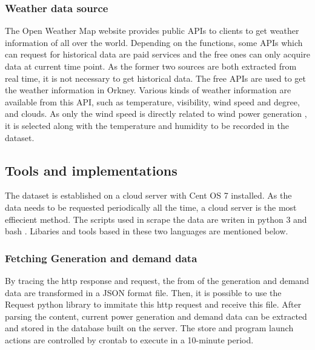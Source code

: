 \documentclass[12pt,a4paper]{report}
\begin{document}
            \subsubsection{Weather data source}
            \label{text_weather_data_source}
                The Open Weather Map website \cite{website:OpenWeatherMap} provides public APIs to clients to get weather information of all over the world.
                Depending on the functions, some APIs which can request for historical data are paid services and the free ones can only acquire data at current time point.
                As the former two sources are both extracted from real time, it is not necessary to get historical data. The free APIs are used to get the weather
                information in Orkney. Various kinds of weather information are available from this API, such as temperature, visibility, wind speed and degree, and clouds.
                As only the wind speed is directly related to wind power generation \cite{paper:Shao2010}, it is selected along with the temperature and humidity to be recorded in the dataset.
            
        \subsection{Tools and implementations}
        The dataset is established on a cloud server with Cent OS 7 installed. As the data needs to be requested periodically all the time, a cloud server is the most
        effiecient method. The scripts used in scrape the data are writen in python 3 \cite{website:python3} and bash \cite{website:bash}. Libaries and tools based in these two languages are mentioned below.

                \subsubsection{Fetching Generation and demand data}
                By tracing the http response and request, the from of the generation and demand data are transformed in a JSON format file. Then, it is possible to 
                use the Request python library \cite{website:requestpython} to immitate this http request and receive this file. After parsing the content, current power generation and demand data can
                be extracted and stored in the database built on the server. The store and program launch actions are controlled by crontab \cite{website:crontab} to execute in a 10-minute period.
\end{document}
